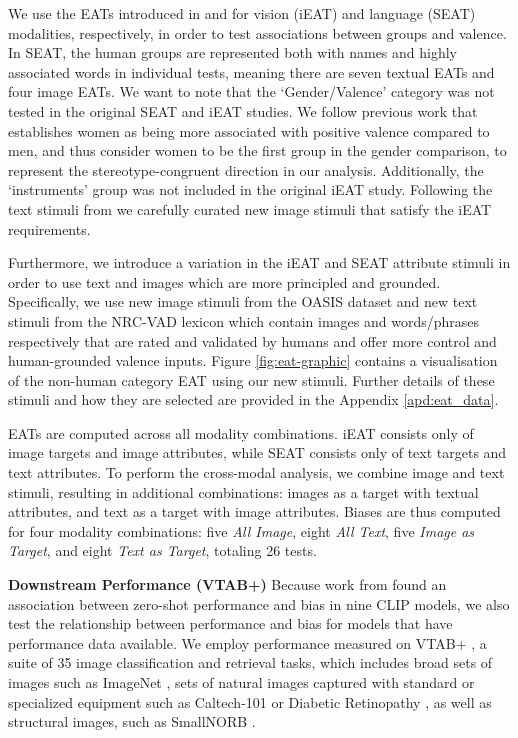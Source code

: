 We use the EATs introduced in \citet{Steed2021} and \citet{May2019OnEncoders} for vision (iEAT) and language (SEAT) modalities, respectively, in order to test associations between groups and valence. In SEAT, the human groups are represented both with names and highly associated words in individual tests, meaning there are seven textual EATs and four image EATs. We want to note that the `Gender/Valence' category was not tested in the original SEAT and iEAT studies. We follow previous work \cite{caliskan2022gender, charlesworth2024extracting} that establishes women as being more associated with positive valence compared to men, and thus consider women to be the first group in the gender comparison, to represent the stereotype-congruent direction in our analysis.  Additionally, the `instruments' group was not included in the original iEAT study. Following the text stimuli from \citet{May2019OnEncoders} we carefully curated new image stimuli that satisfy the iEAT requirements. 

Furthermore, we introduce a variation in the iEAT and SEAT attribute stimuli in order to use text and images which are more principled and grounded. Specifically, we use new image stimuli from the OASIS dataset \cite{kurdi2017introducing} and new text stimuli from the NRC-VAD lexicon \cite{mohammad2018obtaining} which contain images and words/phrases respectively that are rated and validated by humans and offer more control and human-grounded valence inputs. Figure \ref{fig:eat-graphic} contains a visualisation of the non-human category EAT using our new stimuli. Further details of these stimuli and how they are selected are provided in the Appendix \ref{apd:eat_data}.


EATs are computed across all modality combinations. iEAT consists only of image targets and image attributes, while SEAT consists only of text targets and text attributes. To perform the cross-modal analysis, we combine image and text stimuli, resulting in additional combinations: images as a target with textual attributes, and text as a target with image attributes. Biases are thus computed for four modality combinations: five \textit{All Image}, eight \textit{All Text}, five \textit{Image as Target}, and eight \textit{Text as Target}, totaling 26 tests.


\noindent\textbf{Downstream Performance (VTAB+)}
Because work from \citet{Berg2022ALearning} found an association between zero-shot performance and bias in nine CLIP models, we also test the relationship between performance and bias for models that have performance data available. We employ performance measured on VTAB+ \cite{Schuhmann2022LAION-5B:Models}, a suite of 35 image classification and retrieval tasks, which includes broad sets of images such as ImageNet \cite{Deng2009Imagenet:Database}, sets of natural images captured with standard or specialized equipment such as Caltech-101 \cite{Li2022Caltech101} or Diabetic Retinopathy \cite{Gulshan2016DevelopmentPhotographs}, as well as structural images, such as SmallNORB \cite{LeCun2004LearningLighting}. 